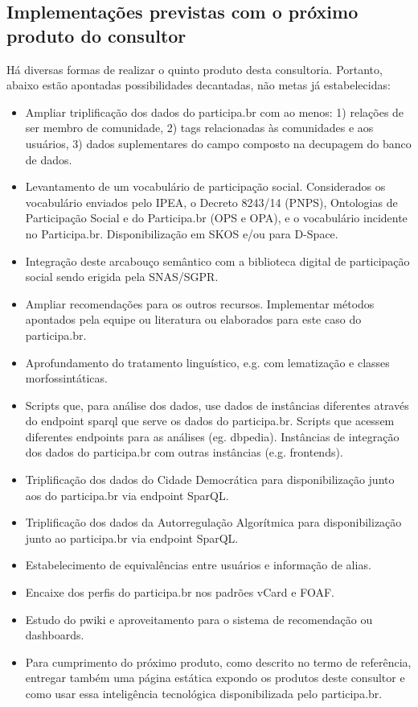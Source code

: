 \documentclass[12pt]{article}
\begin{document}
\subsection{Implementações previstas com o próximo produto do consultor}
Há diversas formas de realizar o quinto produto desta consultoria. Portanto, abaixo estão apontadas possibilidades decantadas, não metas já estabelecidas:
\begin{itemize}
    \item Ampliar triplificação dos dados do participa.br com ao menos: 1) relações de ser membro de comunidade, 2) tags relacionadas às comunidades e aos usuários, 3) dados suplementares do campo composto na decupagem do banco de dados.
    \item Levantamento de um vocabulário de participação social. Considerados os vocabulário enviados pelo IPEA, o Decreto 8243/14 (PNPS), Ontologias de Participação Social e do Participa.br (OPS e OPA), e o vocabulário incidente no Participa.br. Disponibilização em SKOS e/ou para D-Space.
    \item Integração deste arcabouço semântico com a biblioteca digital de participação social sendo erigida pela SNAS/SGPR.
    \item Ampliar recomendações para os outros recursos. Implementar métodos apontados pela equipe ou literatura ou elaborados para este caso do participa.br.
    \item Aprofundamento do tratamento linguístico, e.g. com lematização e classes morfossintáticas.
    \item Scripts que, para análise dos dados, use dados de instâncias diferentes através do endpoint sparql que serve os dados do participa.br. Scripts que acessem diferentes endpoints para as análises (eg. dbpedia). Instâncias de integração dos dados do participa.br com outras instâncias (e.g. frontends).
    \item Triplificação dos dados do Cidade Democrática para disponibilização junto aos do participa.br via endpoint SparQL.
    \item Triplificação dos dados da Autorregulação Algorítmica para disponibilização junto ao participa.br via endpoint SparQL.
    \item Estabelecimento de equivalências entre usuários e informação de alias.
    \item Encaixe dos perfis do participa.br nos padrões vCard e FOAF.
    \item Estudo do pwiki e aproveitamento para o sistema de recomendação ou dashboards.
    \item Para cumprimento do próximo produto, como descrito no termo de referência, entregar também uma página estática expondo os produtos deste consultor e como usar essa inteligência tecnológica disponibilizada pelo participa.br.
\end{itemize}
\end{document}
